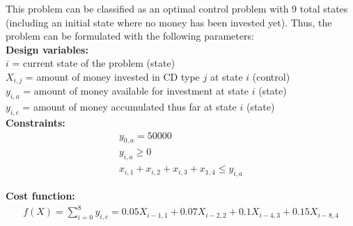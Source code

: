 \documentclass[11pt]{article}
\begin{document}
\begin{prob}{3}
\end{prob}
\begin{sol} 
This problem can be classified as an optimal control problem with 9 total states (including an initial state where no money has been invested yet). Thus, the problem can be formulated with the following parameters:\\

\textbf{Design variables:}\\
$i$ = current state of the problem (state) \\
$X_{i,j}$ = amount of money invested in CD type $j$ at state $i$ (control) \\
$y_{i,a}$ = amount of money available for investment at state $i$ (state) \\
$y_{i,c}$ = amount of money accumulated thus far at state $i$ (state) \\

\textbf{Constraints:} 
\begin{eqnarray*}
y_{0,a} = 50000 \\
y_{i,a} \geq 0 \\
x_{i,1} + x_{i,2} + x_{i,3} + x_{1,4} \leq y_{i,a}
\end{eqnarray*}

\textbf{Cost function:}
\begin{eqnarray*}
f(X) = \sum_{i=0}^{8} y_{i,c} = 0.05X_{i-1,1} + 0.07X_{i-2,2} + 0.1X_{i-4,3} + 0.15X_{i-8,4}
\end{eqnarray*}

\end{sol}
\end{document}
